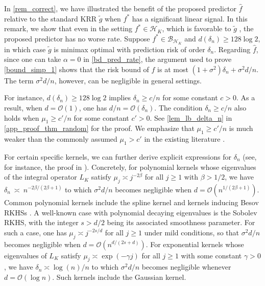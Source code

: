 \documentclass[11pt,twoside]{article}
\def\cO{\mathcal{O}}
\def\cH{\mathcal H}
\def\cB{\mathcal B}
\def\wh{\widehat}
\def\wt{\widetilde}
\begin{document}
\begin{remark}\label{rem_var}
In \cref{rem_correct}, we have illustrated the benefit of the proposed predictor $\wh f$ relative to the standard KRR $\wt g$ when $f^*$ has a significant linear signal. In this remark, we show that even in the setting $f^* \in \cH_K$, which is favorable to $\wt g$ , the proposed predictor has no worse rate.
Suppose $f^* \in \cB_{\cH_K}$ and $d(\delta_n) \ge 128 \log 2$, in which case $\wt g$ is minimax optimal with prediction risk of order $\delta_n$. Regarding $\wh f$, since one can take $\alpha = 0$ in \eqref{bd_pred_rate}, the argument used to prove \eqref{bound_simp_1} shows that the risk bound of $\wh f$ is at most $(1+\sigma^2)\delta_n + \sigma^2 d/n$. The term $\sigma^2 d/n$, however, can be negligible in general settings.

 For instance, $d(\delta_n) \ge 128 \log 2$ implies $\delta_n \ge c/n$ for some constant $c>0$. As a result, when $d = \cO(1)$, one has $d/n = \cO(\delta_n)$. The condition $\delta_n \ge c/n$ also holds when $\mu_1 \ge c'/n$ for some constant $c'>0$. See \cref{lem_lb_delta_n} in \cref{app_proof_thm_random} for the proof. We emphasize that $\mu_1 \ge c'/n$ is much weaker than the commonly assumed $\mu_1 > c'$ in the existing literature \citep{caponnetto2007optimal,rudi2017generalization}. 



 For certain specific kernels, we can further derive explicit expressions for $\delta_n$  (see, for instance, the proof in \citet{bing2025kernel}). Concretely, for polynomial kernels whose eigenvalues of the integral operator $L_K$ satisfy
    $\mu_j \asymp  j^{-2\beta}$ for all $j\ge 1$ with $\beta >1/2$,  we have  
    $
        \delta_n ~ \asymp ~  n^{-{2\beta /(2\beta+1)}}
    $
    to which $\sigma^2 d/n$  becomes negligible when $d = \cO(n^{1/(2\beta+1)})$. Common polynomial kernels include the spline kernel \citep{wahba1990spline} and kernels inducing Besov RKHSs \citep{fischer2020sobolev}. 
A  well-known case with polynomial decaying eigenvalues is the    Sobolev RKHS, with the integer $s>d/2$ being its associated 
smoothness parameter. For such a case, one has  $\mu_j \asymp  j^{-2s/d}$ for all $j\ge 1$  \citep{edmunds1996function} under mild conditions, 
so that
$\sigma^2 d/n$  becomes negligible when $d = \cO(n^{d/(2s+d)})$.  
    For  exponential kernels whose eigenvalues of $L_K$ satisfy $\mu_j \asymp \exp(-\gamma j)$ for all $j\ge 1$  with some constant $\gamma>0$,  we have  $ \delta_n\asymp  \log (n) / n $ to which $\sigma^2 d/n$  becomes negligible whenever $d = \cO(\log n)$. Such kernels include the Gaussian kernel.
\end{remark} 
\end{document}
